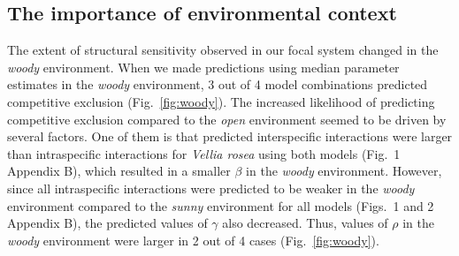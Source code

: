 \begin{refsection}

\subsection*{The importance of environmental context}

The extent of structural sensitivity observed in our focal system changed in the \textit{woody} environment. When we made predictions using median parameter estimates in the  \textit{woody} environment, 3 out of 4 model combinations  predicted competitive exclusion (Fig.~\ref{fig:woody}). The increased likelihood of predicting competitive exclusion compared to the \textit{open} environment seemed to be driven by several factors. One of them is that predicted interspecific interactions were larger than intraspecific interactions for \textit{Vellia rosea} using both models (Fig.~1 Appendix B), which resulted in a smaller $\beta$ in the \textit{woody} environment. However, since all intraspecific interactions were predicted to be weaker in the \textit{woody} environment compared to the \textit{sunny} environment for all models (Figs.~1 and 2 Appendix B), the predicted values of $\gamma$ also decreased. Thus, values of $\rho$ in the \textit{woody} environment were larger in 2 out of 4 cases (Fig.~\ref{fig:woody}).


\end{refsection}
